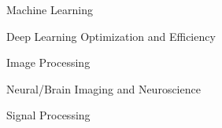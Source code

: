 


\begin{cventries}



{
\begin{cvitems}
\item {\fontsize{12}{16}\selectfont Machine Learning}
\item {\fontsize{12}{16}\selectfont Deep Learning Optimization and Efficiency}
\item {\fontsize{12}{16}\selectfont Image Processing}
\item {\fontsize{12}{16}\selectfont Neural/Brain Imaging and Neuroscience}
\item {\fontsize{12}{16}\selectfont Signal Processing}
\end{cvitems}
}
\cvsubsection{}


\end{cventries}